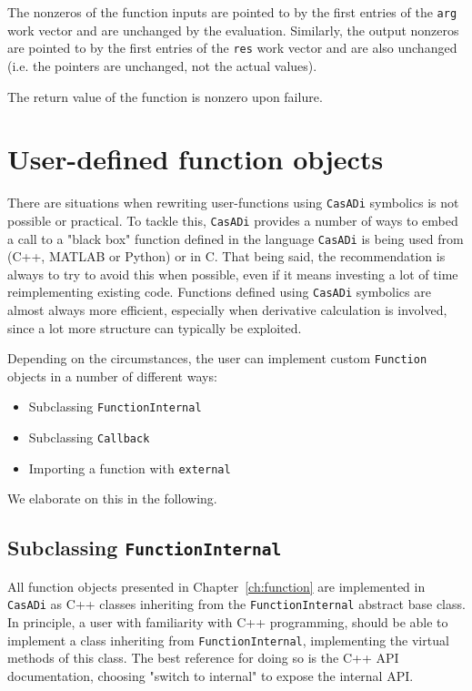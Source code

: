 \documentclass[a4paper,12pt]{book}
\newcommand{\CasADi}{\texttt{CasADi}\xspace}
\begin{document}
The nonzeros of the function inputs are pointed to by the
first entries of the \texttt{arg} work vector and are unchanged by the evaluation.
Similarly, the output nonzeros are pointed to by the first entries of the
\texttt{res} work vector and are also unchanged (i.e. the pointers are unchanged,
not the actual values).

The return value of the function is nonzero upon failure.


\chapter{User-defined function objects} \label{ch:user-defined}
There are situations when rewriting user-functions using \CasADi symbolics is not
possible or practical. To tackle this, \CasADi provides a number of ways to
embed a call to a "black box" function defined in the language \CasADi is being
used from (C++, MATLAB or Python) or in C.
That being said, the recommendation is always to try to avoid this when possible,
even if it means investing a lot of time reimplementing existing code.
Functions defined using \CasADi symbolics are almost always more
efficient, especially when derivative calculation is involved, since a lot more
structure can typically be exploited.

Depending on the circumstances, the user can implement custom \texttt{Function}
objects in a number of different ways:

\begin{itemize}
\item Subclassing \texttt{FunctionInternal}
\item Subclassing \texttt{Callback}
\item Importing a function with \texttt{external}
\end{itemize}

We elaborate on this in the following.
\section{Subclassing \texttt{FunctionInternal}}
All function objects presented in Chapter~\ref{ch:function} are implemented
in \CasADi as C++ classes inheriting from the \texttt{FunctionInternal} abstract
base class. In principle, a user with familiarity with C++ programming, should
be able to implement a class inheriting from \texttt{FunctionInternal},
implementing the virtual methods of this class. The best reference for doing so
is the C++ API documentation, choosing "switch to internal" to expose the internal
API.
\end{document}
